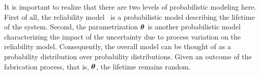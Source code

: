 \begin{remark} 
It is important to realize that there are two levels of probabilistic modeling here.
First of all, the reliability model \perse\ is a probabilistic model describing the lifetime of the system.
Second, the parametrization $\bm{\theta}$ is another probabilistic model characterizing the impact of the uncertainty due to process variation on the reliability model.
Consequently, the overall model can be thought of as a probability distribution over probability distributions.
Given an outcome of the fabrication process, that is, $\bm{\theta}$, the lifetime remains random.
\end{remark}
